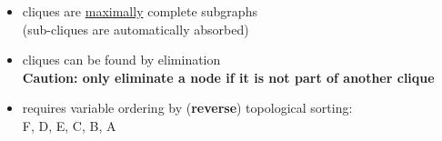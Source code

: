 \begin{frame} \frametitle{\subsecname
}
					\slidesonly{\vspace{5mm}}
				\begin{itemize}
					\item cliques are \underline{maximally} complete subgraphs\\
					(sub-cliques are automatically absorbed)
					\item cliques can be found by elimination \\
					
					\slidesonly{\vspace{10mm}}
					\textbf{Caution: only eliminate a node if it is not part of another clique}
					\slidesonly{\vspace{5mm}}
					\item requires variable ordering by (\textbf{reverse}) topological sorting:\\
						F, D, E, C, B, A
				\end{itemize}
	
	
	

\end{frame}

